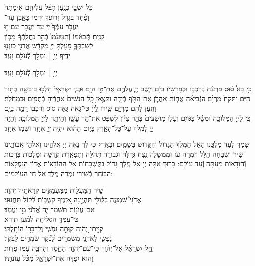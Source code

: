 \documentclass[twoside, openany, parskip=half, 11pt]{book}
\begin{document}
כֹּ֖ל יֹשְֿׁבֵ֥י כְֿנָֽעַן׃ \hfill תִּפֹּ֨ל עֲלֵיהֶ֤ם אֵימָ֙תָה֙ \\
וָפַ֔חַד \hfill בִּגְדֹ֥ל זְֿרוֹעֲךָ֖ יִדְּֿמ֣וּ כָּאָ֑בֶן \hfill עַד־\\
יַעֲבֹ֤ר עַמְּֿךָ֙ יְיָ֔ \hfill עַֽד־יַעֲבֹ֖ר עַם־ז֥וּ \\
קָנִֽיתָ׃ \hfill תְּֿבִאֵ֗מוֹ וְֿתִטָּעֵ֙מוֹ֙ בְּֿהַ֣ר נַחֲלָֽתְֿךָ֔ \hfill מָכ֧וֹן \\
לְֿשִׁבְתְּֿֿךָ֛ פָּעַ֖לְתָּ יְיָ֑ \hfill מִקְּֿדָ֕שׁ אֲדֹנָ֖י כּוֹנְֿנ֥וּ \\
יָדֶֽיךָ׃ \hfill יְיָ֥ ׀ יִמְלֹ֖ךְ לְֿעֹלָ֥ם וָעֶֽד׃\hfill \break
\begin{small}
יְיָ֥ ׀ יִמְלֹ֖ךְ לְֿעֹלָ֥ם וָעֶֽד׃\\
\end{small}
כִּ֣י בָא֩ ס֨וּס פַּרְעֹ֜ה בְּֿרִכְבּ֤וֹ וּבְפָרָשָׁיו֙ בַּיָּ֔ם וַיָּ֧שֶׁב יְיָ֛ עֲלֵהֶ֖ם אֶת־מֵ֣י הַיָּ֑ם וּבְנֵ֧י יִשְׂרָאֵ֛ל הָלְֿכ֥וּ בַיַּבָּשָׁ֖ה בְּֿת֥וֹךְ הַיָּֽם׃ וַתִּקַּח֩ מִרְיָ֨ם הַנְּֿבִיאָ֜ה אֲח֧וֹת אַהֲרֹ֛ן אֶת־הַתֹּ֖ף בְּֿיָדָ֑הּ וַתֵּצֶ֤אןָ כׇֽל־הַנָּשִׁים֙ אַחֲרֶ֔יהָ בְּֿתֻפִּ֖ים וּבִמְחֹלֹֽת׃ וַתַּ֥עַן לָהֶ֖ם מִרְיָ֑ם שִׁ֤ירוּ לַֽייָ֙ כִּֽי־גָאֹ֣ה גָּאָ֔ה ס֥וּס וְֿרֹכְֿב֖וֹ רָמָ֥ה בַיָּֽם׃
\\
כִּ֣י לַ֭ייָ֭ הַמְּֿלוּכָ֑ה וּ֝מֹשֵׁ֗ל בַּגּוֹיִֽם׃
וְֿעָל֤וּ מֽוֹשִׁעִים֙ בְּֿהַ֣ר צִיּ֔וֹן לִשְׁפֹּ֖ט אֶת־הַ֣ר עֵשָׂ֑ו וְֿהָיְֿתָ֥ה לַֽייָ֖ הַמְּֿלוּכָֽה׃
וְֿהָיָ֧ה יְיָ֛ לְֿמֶ֖לֶךְ עַל־כׇּל־הָאָ֑רֶץ בַּיּ֣וֹם הַה֗וּא יִהְיֶ֧ה יְיָ֛ אֶחָ֖ד וּשְׁמ֥וֹ אֶחָֽד׃


שִׁמְךָ לָעַד מַלְכֵּֽנוּ הָאֵל הַמֶּֽלֶךְ הַגָּדוֹל וְֿהַקָּדוֹשׁ בַּשָׁמַֽיִם וּבָאָֽרֶץ כִּי לְֿךָ נָאֶה יְיָ אֱלֹהֵֽינוּ וֵאלֹהֵי אֲבוֹתֵֽינוּ שִׁיר וּשְׁבָחָה הַלֵּל וְֿזִמְרָה עֹז וּמֶמְשָׁלָה נֶֽצַח גְּֿדֻלָּה וּגְבוּרָה תְּֿהִלָּה וְֿתִפְאֶֽרֶת קְֿדֻשָּׁה וּמַלְכוּת בְּֿרָכוֹת וְֿהוֹדָאוֹת מֵעַתָּה וְֿעַד עוֹלָם: בָּרוּךְ אַתָּה יְיָ אֵל מֶֽלֶךְ גָּדוֹל בַּתֻּשְׁבָּחוֹת אֵל הַהוֹדָאוֹת אֲדוֹן הַנִּפְלָאוֹת הַבּוֹחֵר בְּֿשִׁירֵי זִמְרָה מֶֽלֶךְ אֵל חֵי הָעוֹלָמִים:
\newcommand{\mimaamakim}{
\begin{narrow}
	\instruction{בעשי״ת:}
שִׁ֥יר הַֽמַּעֲל֑וֹת	מִמַּעֲמַקִּ֖ים קְרָאתִ֣יךָ יְהֹוָֽה׃\\
אֲדֹנָי֮ שִׁמְעָ֢ה בְק֫וֹלִ֥י תִּהְיֶ֣ינָה אׇ֭זְנֶיךָ קַשֻּׁב֑וֹת לְ֝ק֗וֹל תַּחֲנוּנָֽי׃\\
אִם־עֲוֺנ֥וֹת תִּשְׁמׇר־יָ֑הּ אֲ֝דֹנָ֗י מִ֣י יַעֲמֹֽד׃\\
כִּֽי־עִמְּךָ֥ הַסְּלִיחָ֑ה לְ֝מַ֗עַן תִּוָּרֵֽא׃\\
קִוִּ֣יתִי יְ֭הֹוָה קִוְּתָ֣ה נַפְשִׁ֑י וְֽלִדְבָר֥וֹ הוֹחָֽלְתִּי׃\\
נַפְשִׁ֥י לַאדֹנָ֑י מִשֹּׁמְרִ֥ים לַ֝בֹּ֗קֶר שֹׁמְרִ֥ים לַבֹּֽקֶר׃\\
יַחֵ֥ל יִשְׂרָאֵ֗ל אֶל־יְהֹ֫וָ֥ה כִּֽי־עִם־יְהֹוָ֥ה הַחֶ֑סֶד וְהַרְבֵּ֖ה עִמּ֣וֹ פְדֽוּת׃\\
וְ֭הוּא יִפְדֶּ֣ה אֶת־יִשְׂרָאֵ֑ל מִ֝כֹּ֗ל עֲוֺנֹתָֽיו׃ \\
\end{narrow}
}
\mimaamakim
\halfkaddish
\end{document}
